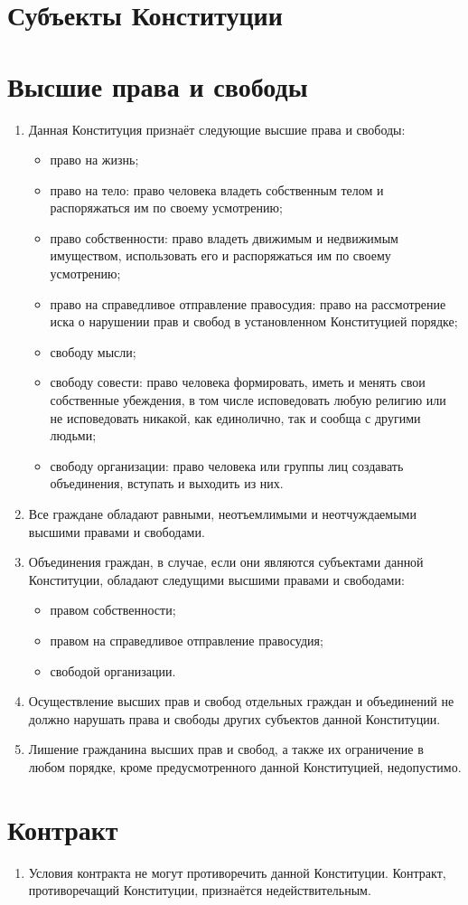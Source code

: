 
\section{Субъекты Конституции} %

\section{Высшие права и свободы}
\begin{enumerate}
    \item Данная Конституция признаёт следующие высшие права и свободы:
    \begin{itemize}
        \item право на жизнь;
         \item право на тело: право человека владеть собственным телом и распоряжаться им по своему усмотрению;
         \item право собственности: право владеть движимым и недвижимым имуществом, использовать его и распоряжаться им по своему усмотрению;
         \item право на справедливое отправление правосудия: право на рассмотрение иска о нарушении прав и свобод в установленном Конституцией порядке;
         \item свободу мысли;
         \item свободу совести: право человека формировать, иметь и менять свои собственные убеждения, в том числе исповедовать любую религию или не исповедовать никакой, как единолично, так и сообща с другими людьми;
         \item свободу организации: право человека или группы лиц создавать объединения, вступать и выходить из них.
    \end{itemize}
    \item Все граждане обладают равными, неотъемлимыми и неотчуждаемыми высшими правами и свободами.
    \item Объединения граждан, в случае, если они являются субъектами данной Конституции, обладают следущими высшими правами и свободами:
    \begin{itemize}
        \item правом собственности;
        \item правом на справедливое отправление правосудия;
        \item свободой организации.
    \end{itemize}
    \item Осуществление высших прав и свобод отдельных граждан и объединений не должно нарушать права и свободы других субъектов данной Конституции. 
    \item Лишение гражданина высших прав и свобод, а также их ограничение в любом порядке, кроме предусмотренного данной Конституцией, недопустимо. 
    
    
\end{enumerate}
\section{Контракт}
\begin{enumerate}
    
    
    
    
    \item Условия контракта не могут противоречить данной Конституции. Контракт, противоречащий Конституции, признаётся недействительным.
\end{enumerate}
